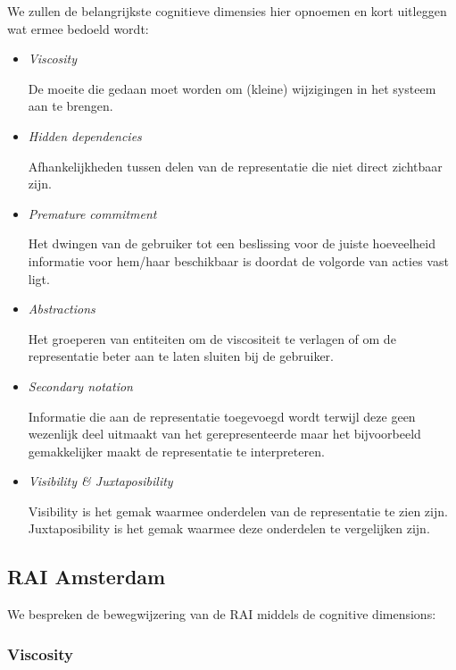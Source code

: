 We zullen de belangrijkste cognitieve dimensies hier opnoemen en kort uitleggen wat ermee bedoeld wordt:


\begin{itemize}

\item \emph{Viscosity}

De moeite die gedaan moet worden om (kleine) wijzigingen in het systeem aan te brengen.

\item \emph{Hidden dependencies}

Afhankelijkheden tussen delen van de representatie die niet direct zichtbaar zijn.

\item \emph{Premature commitment}

Het dwingen van de gebruiker tot een beslissing voor de juiste hoeveelheid informatie voor hem/haar beschikbaar is doordat de volgorde van acties vast ligt.

\item \emph{Abstractions}

Het groeperen van entiteiten om de viscositeit te verlagen of om de representatie beter aan te laten sluiten bij de gebruiker.

\item \emph{Secondary notation}

Informatie die aan de representatie toegevoegd wordt terwijl deze geen wezenlijk deel uitmaakt van het gerepresenteerde maar het bijvoorbeeld gemakkelijker maakt de representatie te interpreteren.

\item \emph{Visibility \& Juxtaposibility}

Visibility is het gemak waarmee onderdelen van de representatie te zien zijn. Juxtaposibility is het gemak waarmee deze onderdelen te vergelijken zijn.

\end{itemize}


\subsection{RAI Amsterdam} \label{sectie:cd_rai}

We bespreken de bewegwijzering van de RAI middels de cognitive dimensions:


\subsubsection{Viscosity}

